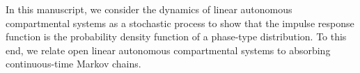 \documentclass[smallextended]{svjour3}
\begin{document}
In this manuscript, we consider the dynamics of linear autonomous compartmental systems as a stochastic process to show that the impulse response function is the probability density function of a phase-type distribution.
To this end, we relate open linear autonomous compartmental systems to absorbing continuous-time Markov chains.



\end{document}
